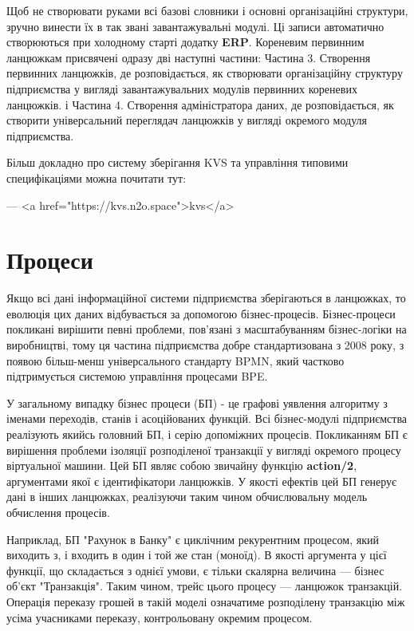         Щоб не створювати руками всі базові словники і основні організаційні структури,
           зручно винести їх в так звані завантажувальні модулі. Ці записи автоматично
           створюються при холодному старті додатку \textbf{ERP}. Кореневим первинним ланцюжкам
           присвячені одразу дві наступні частини:
           Частина 3. Створення первинних ланцюжків, де розповідається, як створювати організаційну
           структуру підприємства у вигляді завантажувальних модулів первинних кореневих ланцюжків. і
           Частина 4. Створення адміністратора даних, де розповідається, як створити
           універсальний переглядач ланцюжків у вигляді окремого модуля підприємства.

        Більш докладно про систему зберігання KVS та управління типовими специфікаціями
            можна почитати тут:

        — <a href="https://kvs.n2o.space">kvs</a>

        \section{Процеси}

        Якщо всі дані інформаційної системи підприємства зберігаються в ланцюжках,
           то еволюція цих даних відбувається за допомогою бізнес-процесів.
           Бізнес-процеси покликані вирішити певні проблеми, пов'язані
           з масштабуванням бізнес-логіки на виробництві, тому ця частина
           підприємства добре стандартизована з 2008 року, з появою більш-менш
           універсального стандарту BPMN, який частково підтримується системою
           управління процесами BPE.

        У загальному випадку бізнес процеси (БП) - це графові уявлення алгоритму з іменами переходів,
           станів і асоційованих функцій. Всі бізнес-модулі підприємства реалізують
           якийсь головний БП, і серію допоміжних процесів. Покликанням БП є вирішення проблеми
           ізоляції розподіленої транзакції у вигляді окремого процесу віртуальної машини.
           Цей БП являє собою звичайну функцію \textbf{action/2}, аргументами якої
           є ідентифікатори ланцюжків. У якості ефектів цей БП генерує дані
           в інших ланцюжках, реалізуючи таким чином обчислювальну модель обчислення процесів.

        Наприклад, БП "Рахунок в Банку" є циклічним рекурентним процесом,
           який виходить з, і входить в один і той же стан (моноїд). В якості аргумента
           у цієї функції, що складається з однієї умови, є тільки скалярна
           величина — бізнес об'єкт "Транзакція". Таким чином, трейс цього
           процесу — ланцюжок транзакцій. Операція переказу грошей в такій моделі
           означатиме розподілену транзакцію між усіма учасниками переказу,
           контрольовану окремим процесом.

